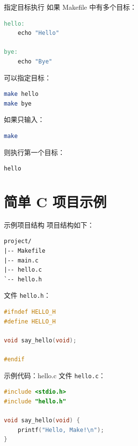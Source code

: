 \documentclass[aspectratio=169]{ctexbeamer}
\begin{document}
\begin{frame}{指定目标执行}
如果 Makefile 中有多个目标：

\begin{lstlisting}[language=make]
hello:
	echo "Hello"

bye:
	echo "Bye"
\end{lstlisting}

可以指定目标：

\begin{lstlisting}[language=bash]
make hello
make bye
\end{lstlisting}

如果只输入：

\begin{lstlisting}[language=bash]
make
\end{lstlisting}

则执行第一个目标：

\begin{lstlisting}[language=make]
hello
\end{lstlisting}
\end{frame}

\section{简单 C 项目示例}

\begin{frame}[fragile]{示例项目结构}
项目结构如下：

\begin{lstlisting}
project/
|-- Makefile
|-- main.c
|-- hello.c
`-- hello.h
\end{lstlisting}

文件 \texttt{hello.h}：

\begin{lstlisting}[language=C]
#ifndef HELLO_H
#define HELLO_H

void say_hello(void);

#endif
\end{lstlisting}
\end{frame}

\begin{frame}[fragile]{示例代码：hello.c}
文件 \texttt{hello.c}：

\begin{lstlisting}[language=C]
#include <stdio.h>
#include "hello.h"

void say_hello(void) {
    printf("Hello, Make!\n");
}
\end{lstlisting}
\end{frame}
\end{document}
